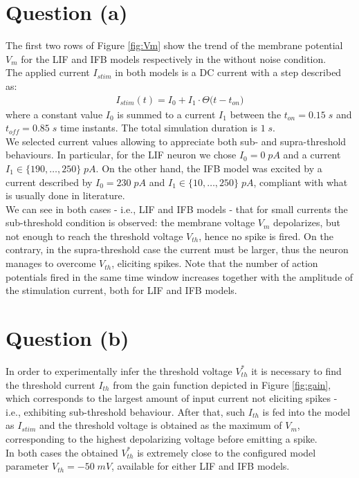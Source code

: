 \documentclass[10.5pt]{article}
\begin{document}
\newpage

\section*{Question (a)}
The first two rows of Figure \ref{fig:Vm} show the trend
of the membrane potential \(V_{m}\) for the LIF and IFB models respectively in
the without noise condition.\\
The applied current \(I_{stim}\) in both models is a DC current with a step described as:
\begin{align*}
    I_{stim}(t) = I_0+I_1\cdot\Theta\bigl(t-t_{on}\bigr)
\end{align*}
where a constant value \(I_{0}\) is summed to a current \(I_{1}\) between the \(t_{on}=0.15\;s\)
and \(t_{off}=0.85\;s\) time instants. The total simulation duration is \(1\;s\).\\
We selected current values allowing to appreciate both sub- and supra-threshold behaviours.
In particular, for the LIF neuron we chose \(I_0=0\;pA\) and a current
\(I_1\in\{190,\dots{,250}\}\;pA\). On the other hand, the IFB model was excited by
a current described by \(I_0=230\;pA\) and \(I_1\in\{10,\dots{,250}\}\;pA\), compliant
with what is usually done in literature.\\

We can see in both cases - i.e., LIF and IFB models - that for small currents
the sub-threshold condition is observed: the membrane voltage \(V_{m}\) depolarizes, but
not enough to reach the threshold voltage \(V_{th}\), hence no spike is fired.
On the contrary, in the supra-threshold case the current must be larger, thus the neuron 
manages to overcome \(V_{th}\), eliciting spikes. 
Note that the number of action potentials fired in the same time window increases together with the 
amplitude of the stimulation current, both for LIF and IFB models.

\section*{Question (b)}
In order to experimentally infer the threshold voltage \(V_{th}^{*}\) it is
necessary to find the threshold current \(I_{th}\) from the gain function
depicted in Figure \ref{fig:gain},
which corresponds to the largest amount of input current not eliciting
spikes - i.e., exhibiting sub-threshold behaviour. After that,
such \(I_{th}\) is fed into the model as \(I_{stim}\) and the threshold voltage
is obtained as the maximum of \(V_{m}\), corresponding to the highest
depolarizing voltage before emitting a spike.\\
In both cases the obtained \(V_{th}^{*}\) is extremely close to the configured
model parameter \(V_{th}=-50\;mV\), available for either LIF and IFB models.
\end{document}
